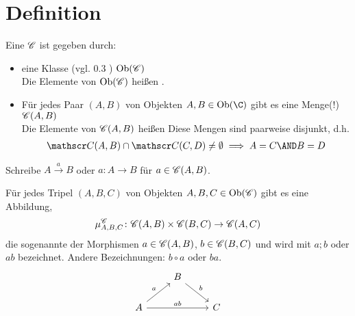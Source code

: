 \section{Definition}
\begin{definition}
	Eine  $\mathscr{C}$ ist gegeben durch:
	\begin{itemize}
		\item eine Klasse (vgl. 0.3 %
		) $\operatorname{Ob}(\mathscr{C})$\\
		Die Elemente von $\operatorname{Ob}(\mathscr{C})$ heißen .
		\item Für jedes Paar $(A,B)$ von Objekten $A,B\in\Ob(\C)$ gibt es eine Menge(!) $\mathscr{C}(A,B)$\\
		Die Elemente von $\mathscr{C}(A,B)$ heißen  
		Diese Mengen sind paarweise disjunkt, d.h.
		\begin{align*}
			\Cat(A,B)\cap\Cat(C,D)\neq\emptyset
			\implies A=C\AND B=D
		\end{align*}
	\end{itemize}
\end{definition}

\begin{notation}
	Schreibe $A\overset{a}{\longrightarrow}B$ oder $a\colon A\to B$ für $a\in\mathscr{C}(A,B)$.
\end{notation}

\begin{lemma}
	Für jedes Tripel $(A,B,C)$ von Objekten $A,B,C\in\operatorname{Ob}(\mathscr{C})$ gibt es eine Abbildung, 
	\begin{align*}\index{Komposition}
		\mu_{A,B,C}^\Cat\colon\Cat(A,B)\times\Cat(B,C)\to\Cat(A,C)
	\end{align*}
	die sogenannte  der Morphismen $a\in\mathscr{C}(A,B)$, $b\in\mathscr{C}(B,C)$ und wird mit $a;b$ oder $ab$ bezeichnet.
	Andere Bezeichnungen: $b\circ a$ oder $ba$.
	$$
	\begin{tikzcd}
                                   & B \arrow[rd, "b"] &   \\
A \arrow[ru, "a"] \arrow[rr, "ab"] &                   & C
	\end{tikzcd}
	$$
\end{lemma}

